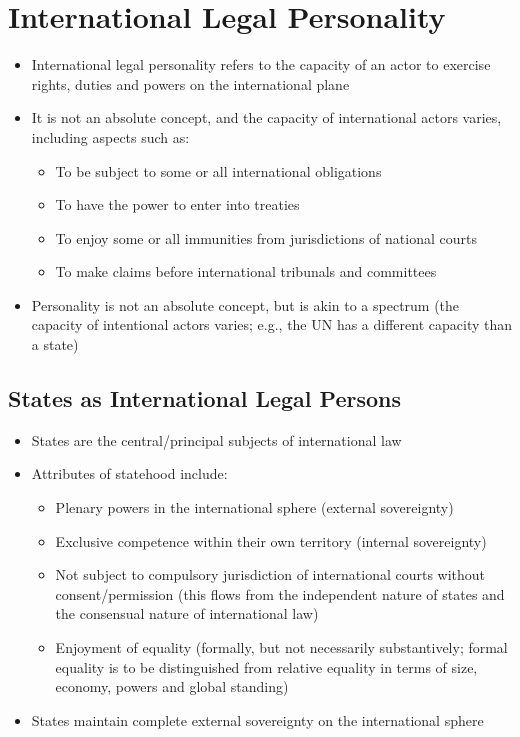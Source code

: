 \section{International Legal Personality}
\begin{itemize}
    \item International legal personality refers to the capacity of an actor to exercise rights, duties and powers on the international plane
    \item It is not an absolute concept, and the capacity of international actors varies, including aspects such as:
    \begin{itemize}
        \item To be subject to some or all international obligations
        \item To have the power to enter into treaties
        \item To enjoy some or all immunities from jurisdictions of national courts
        \item To make claims before international tribunals and committees
    \end{itemize}
    \item Personality is not an absolute concept, but is akin to a spectrum (the capacity of intentional actors varies; e.g., the UN has a different capacity than a state)
\end{itemize}

\subsection{States as International Legal Persons}
\begin{itemize}
    \item States are the central/principal subjects of international law
    \item Attributes of statehood include:
    \begin{itemize}
        \item Plenary powers in the international sphere (external sovereignty)
        \item Exclusive competence within their own territory (internal sovereignty)
        \item Not subject to compulsory jurisdiction of international courts without consent/permission (this flows from the independent nature of states and the consensual nature of international law)
        \item Enjoyment of equality (formally, but not necessarily substantively; formal equality is to be distinguished from relative equality in terms of size, economy, powers and global standing)
    \end{itemize}
    \item States maintain complete external sovereignty on the international sphere
\end{itemize}

